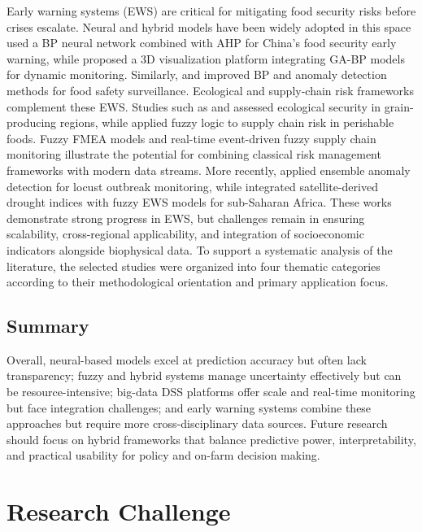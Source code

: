 \documentclass[preprint,12pt]{elsarticle}
\begin{document}
	Early warning systems (EWS) are critical
	for mitigating food security risks before crises escalate. Neural and
	hybrid models have been widely adopted in this space \cite{ref16} used a BP
	neural network combined with AHP for China's food security early
	warning, while \cite{ref28} proposed a 3D visualization platform integrating
	GA-BP models for dynamic monitoring. Similarly, \cite{ref23} and \cite{ref29}
	improved BP and anomaly detection methods for food safety surveillance.
	Ecological and supply-chain risk frameworks complement these EWS.
	Studies such as \cite{ref30} and \cite{ref48} assessed ecological security in
	grain-producing regions, while \cite{ref47} applied fuzzy logic to supply
	chain risk in perishable foods. Fuzzy FMEA models \cite{ref49} and real-time
	event-driven fuzzy supply chain monitoring \cite{ref50} illustrate the
	potential for combining classical risk management frameworks with modern
	data streams. More recently, \cite{ref59} applied ensemble anomaly detection
	for locust outbreak monitoring, while \cite{ref60} integrated
	satellite-derived drought indices with fuzzy EWS models for sub-Saharan
	Africa. These works demonstrate strong progress in EWS, but challenges
	remain in ensuring scalability, cross-regional applicability, and
	integration of socioeconomic indicators alongside biophysical data. To
	support a systematic analysis of the literature, the selected studies
	were organized into four thematic categories according to their
	methodological orientation and primary application focus.
	
	
	\subsection{Summary}
	
	Overall, neural-based models excel at prediction accuracy but often lack
	transparency; fuzzy and hybrid systems manage uncertainty effectively
	but can be resource-intensive; big-data DSS platforms offer scale and
	real-time monitoring but face integration challenges; and early warning
	systems combine these approaches but require more cross-disciplinary
	data sources. Future research should focus on hybrid frameworks that
	balance predictive power, interpretability, and practical usability for
	policy and on-farm decision making.
	
	\section{Research Challenge}
	
\end{document}
